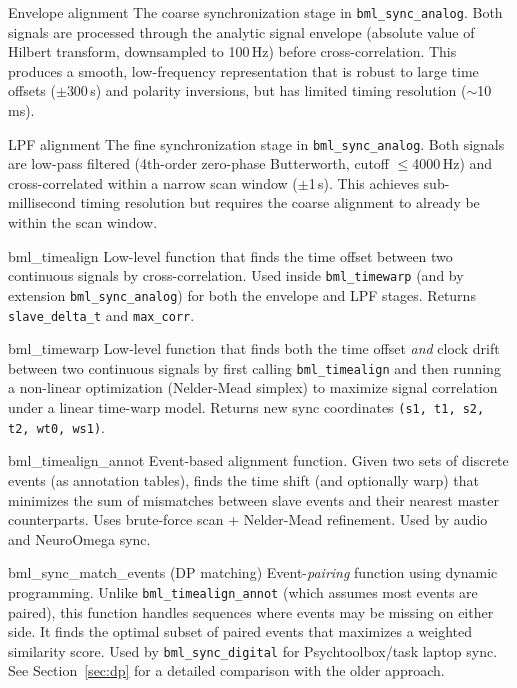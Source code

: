\documentclass[11pt, a4paper]{article}
\begin{document}
\begin{glossentry}{Envelope alignment}
The coarse synchronization stage in \texttt{bml\_sync\_analog}. Both signals are processed through the analytic signal envelope (absolute value of Hilbert transform, downsampled to 100\,Hz) before cross-correlation. This produces a smooth, low-frequency representation that is robust to large time offsets ($\pm$300\,s) and polarity inversions, but has limited timing resolution ($\sim$10\,ms).
\end{glossentry}

\begin{glossentry}{LPF alignment}
The fine synchronization stage in \texttt{bml\_sync\_analog}. Both signals are low-pass filtered (4th-order zero-phase Butterworth, cutoff $\leq$4000\,Hz) and cross-correlated within a narrow scan window ($\pm$1\,s). This achieves sub-millisecond timing resolution but requires the coarse alignment to already be within the scan window.
\end{glossentry}

\begin{glossentry}{bml\_timealign}
Low-level function that finds the time offset between two continuous signals by cross-correlation. Used inside \texttt{bml\_timewarp} (and by extension \texttt{bml\_sync\_analog}) for both the envelope and LPF stages. Returns \texttt{slave\_delta\_t} and \texttt{max\_corr}.
\end{glossentry}

\begin{glossentry}{bml\_timewarp}
Low-level function that finds both the time offset \emph{and} clock drift between two continuous signals by first calling \texttt{bml\_timealign} and then running a non-linear optimization (Nelder-Mead simplex) to maximize signal correlation under a linear time-warp model. Returns new sync coordinates \texttt{(s1, t1, s2, t2, wt0, ws1)}.
\end{glossentry}

\begin{glossentry}{bml\_timealign\_annot}
Event-based alignment function. Given two sets of discrete events (as annotation tables), finds the time shift (and optionally warp) that minimizes the sum of mismatches between slave events and their nearest master counterparts. Uses brute-force scan + Nelder-Mead refinement. Used by audio and NeuroOmega sync.
\end{glossentry}

\begin{glossentry}{bml\_sync\_match\_events (DP matching)}
Event-\emph{pairing} function using dynamic programming. Unlike \texttt{bml\_timealign\_annot} (which assumes most events are paired), this function handles sequences where events may be missing on either side. It finds the optimal subset of paired events that maximizes a weighted similarity score. Used by \texttt{bml\_sync\_digital} for Psychtoolbox/task laptop sync. See Section~\ref{sec:dp} for a detailed comparison with the older approach.
\end{glossentry}
\end{document}
